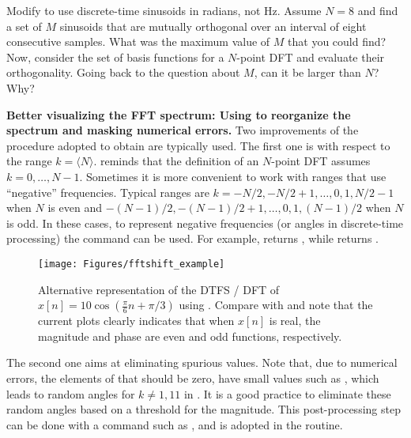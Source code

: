 Modify  to use discrete-time sinusoids in radians, not Hz. Assume $N=8$ and find a set of $M$ sinusoids that are mutually orthogonal over an interval of eight consecutive samples. What was the maximum value of $M$ that you could find? Now, consider the set of basis functions for a $N$-point DFT and evaluate their orthogonality. Going back to the question about $M$, can it be larger than $N$? Why?
\eApplication

\bApplication \textbf{Better visualizing the FFT spectrum: Using  to reorganize the spectrum and masking numerical errors.}
Two improvements of the procedure adopted to obtain  are typically used.
The first one is with respect to the range $k=\langle N\rangle$.
 reminds that the definition of an $N$-point DFT assumes $k=0,\ldots,N-1$. Sometimes it is more convenient to work with ranges that use ``negative'' frequencies. Typical ranges are $k=-N/2,-N/2+1,\ldots,0,1,N/2-1$ when $N$ is even and $-(N-1)/2,-(N-1)/2+1,\ldots,0,1,(N-1)/2$ when $N$ is odd. In these cases, to represent negative frequencies (or angles in discrete-time processing) the command  can be used. For example,  returns \co{[2 3 0 1]}, while  returns \co{[3 4 0 1 2]}.

\begin{figure}[!htb]
        \centering
                \texttt{[image: Figures/fftshift\_example]}            
        \caption[{Alternative representation of the DTFS / DFT of $x[n] = 10 \cos (\frac{\pi}{6} n + \pi/3)$ using .}]{Alternative representation of the DTFS / DFT of $x[n] = 10 \cos (\frac{\pi}{6} n + \pi/3)$ using . Compare with  and note that the current plots clearly indicates that when $x[n]$ is real, the magnitude and phase are even and odd functions, respectively.\label{fig:fftshift_example}}
\end{figure}

The second one aims at eliminating spurious values.
Note that, due to numerical errors, the elements of  that should be zero, have small values such as , which leads to random angles for $k \ne 1,11$ in .
It is a good practice to eliminate these random angles based on a threshold for the magnitude. This post-processing step can be done with a command such as , and is adopted in the {\matlab}  routine.

